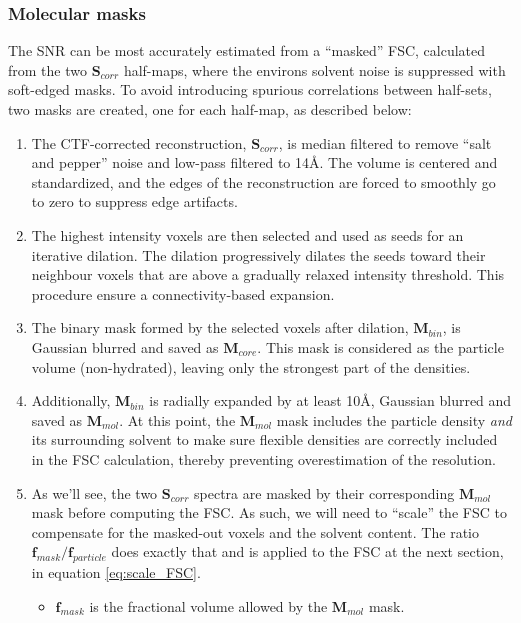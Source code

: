 \subsubsection{Molecular masks} \label{sec:algo:avg:molecular_mask}

The SNR can be most accurately estimated from a ``masked'' FSC, calculated from the two $\bm{S}_{corr}$ half-maps, where the environs solvent noise is suppressed with soft-edged masks. To avoid introducing spurious correlations between half-sets, two masks are created, one for each half-map, as described below:
\begin{enumerate}
    \item The CTF-corrected reconstruction, $\bm{S}_{corr}$, is median filtered to remove ``salt and pepper'' noise and low-pass filtered to 14\si{\angstrom}. The volume is centered and standardized, and the edges of the reconstruction are forced to smoothly go to zero to suppress edge artifacts.
    \item The highest intensity voxels are then selected and used as seeds for an iterative dilation. The dilation progressively dilates the seeds toward their neighbour voxels that are above a gradually relaxed intensity threshold. This procedure ensure a connectivity-based expansion.
    \item The binary mask formed by the selected voxels after dilation, $\bm{M}_{bin}$, is Gaussian blurred and saved as $\bm{M}_{core}$. This mask is considered as the particle volume (non-hydrated), leaving only the strongest part of the densities.
    \item Additionally, $\bm{M}_{bin}$ is radially expanded by at least 10\si{\angstrom}, Gaussian blurred and saved as $\bm{M}_{mol}$. At this point, the $\bm{M}_{mol}$ mask includes the particle density \emph{and} its surrounding solvent to make sure flexible densities are correctly included in the FSC calculation, thereby preventing overestimation of the resolution.
    \item As we'll see, the two $\bm{S}_{corr}$ spectra are masked by their corresponding $\bm{M}_{mol}$ mask before computing the FSC. As such, we will need to ``scale'' the FSC to compensate for the masked-out voxels and the solvent content. The ratio $\bm{f}_{mask} / \bm{f}_{particle}$ does exactly that and is applied to the FSC at the next section, in equation \ref{eq:scale_FSC}.
    \begin{itemize}
        \item $\bm{f}_{mask}$ is the fractional volume allowed by the $\bm{M}_{mol}$ mask.

\end{itemize}
\end{enumerate}
